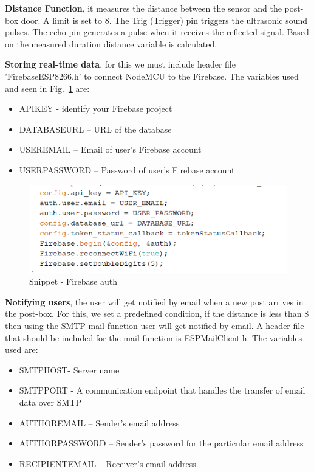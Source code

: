 \textbf{Distance Function}, it measures the distance between the sensor and the post-box door. A limit is set to 8. The Trig (Trigger) pin triggers the ultrasonic sound pulses. The echo pin generates a pulse when it receives the reflected signal. Based on the measured duration distance variable is calculated. 

\textbf{Storing real-time data}, for this we must include header file 'FirebaseESP8266.h' to connect NodeMCU to the Firebase. The variables used and seen in Fig.~\ref{fig:firebaseauth} are: 
\begin{itemize}
    \item API\textunderscore KEY - identify your Firebase project
    \item DATABASE\textunderscore URL – URL of the database
    \item USER\textunderscore EMAIL – Email of user’s Firebase account
    \item USER\textunderscore PASSWORD – Password of user’s Firebase account
\end{itemize}

\begin{figure}[htp]
    \centering
    \includegraphics[width=12cm]{image/firebase-auth.png}
    \caption{Snippet - Firebase auth}
    \label{fig:firebaseauth}
\end{figure}

\textbf{Notifying users}, the user will get notified by email when a new post arrives in the post-box. For this, we set a predefined condition, if the distance is less than 8 then using the SMTP mail function user will get notified by email. A header file that should be included for the mail function is ESP\textunderscore Mail\textunderscore Client.h. The variables used are: 
\begin{itemize}
    \item SMTP\textunderscore HOST- Server name
	\item SMTP\textunderscore PORT - A communication endpoint that handles the transfer of email data over SMTP 
	\item AUTHOR\textunderscore EMAIL – Sender’s email address
	\item AUTHOR\textunderscore PASSWORD – Sender’s password for the particular email address
	\item RECIPIENT\textunderscore EMAIL – Receiver’s email address.
\end{itemize}

